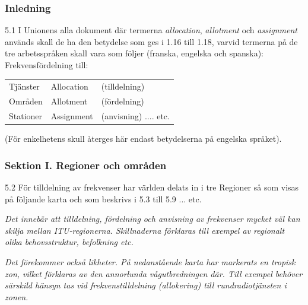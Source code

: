 \subsubsection{Inledning}

5.1 I Unionens alla dokument där termerna \emph{allocation},
\emph{allotment} och \emph{assignment} används skall de ha den
betydelse som ges i 1.16 till 1.18, varvid termerna på de tre
arbetsspråken skall vara som följer (franska, engelska och spanska):
\cite[5.1]{ITU-RR}
Frekvensfördelning till:

\begin{center}
\begin{tabular}{lll}
  Tjänster & Allocation & (tilldelning) \\
  Områden & Allotment & (fördelning) \\
  Stationer & Assignment & (anvisning) .... etc. \\
\end{tabular}
\end{center}

(För enkelhetens skull återges här endast betydelserna på engelska språket).

\subsubsection{Sektion I. Regioner och områden}
\label{regioner}

5.2 För tilldelning av frekvenser har världen delats in i tre
Regioner så som visas på följande karta och som beskrivs i 5.3 till
5.9 ... etc.
\cite[5.2]{ITU-RR}

\emph{ Det innebär att tilldelning, fördelning och anvisning av frekvenser
  mycket väl kan skilja mellan ITU-regionerna.
  Skillnaderna förklaras till exempel av regionalt
  olika behovsstruktur, befolkning
  etc.}

\emph{Det förekommer också likheter.
  På nedanstående karta har markerats en tropisk zon, vilket förklaras av den
  annorlunda vågutbredningen där.
  Till exempel behöver särskild hänsyn tas vid
  frekvenstilldelning (allokering) till
  rundradiotjänsten i zonen.}

